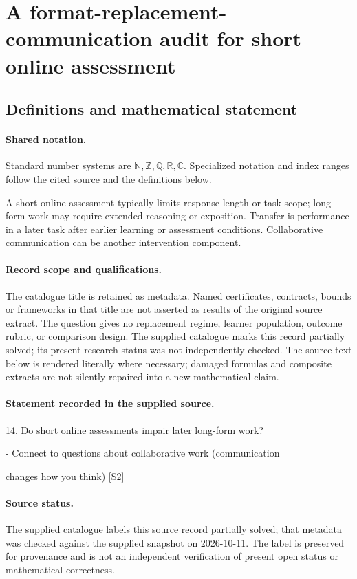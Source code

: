 \documentclass[11pt]{article}
\newcommand{\sref}[2]{\hyperlink{source:#1:#2}{[S#2]}}
\begin{document}
\section{A format-replacement-communication audit for short online assessment}\label{statement}

\subsection{Definitions and mathematical statement}

\paragraph{Shared notation.}Standard number systems are $\mathbb N,\mathbb Z,\mathbb Q,\mathbb R,\mathbb C$. Specialized notation and index ranges follow the cited source and the definitions below.


A short online assessment typically limits response length or task scope; long-form work may require extended reasoning or exposition. Transfer is performance in a later task after earlier learning or assessment conditions. Collaborative communication can be another intervention component.
\paragraph{Record scope and qualifications.}
The catalogue title is retained as metadata. Named certificates, contracts, bounds or frameworks in that title are not asserted as results of the original source extract.
The question gives no replacement regime, learner population, outcome rubric, or comparison design. The supplied catalogue marks this record partially solved; its present research status was not independently checked.
The source text below is rendered literally where necessary; damaged formulas and composite extracts are not silently repaired into a new mathematical claim.
\paragraph{Statement recorded in the supplied source.}
14. Do short online assessments impair later long-form work?

- Connect to questions about collaborative work (communication

changes how you think) \sref{statement}{2}
\paragraph{Source status.}
The supplied catalogue labels this source record partially solved; that metadata was checked against the supplied snapshot on 2026-10-11. The label is preserved for provenance and is not an independent verification of present open status or mathematical correctness.
\end{document}
